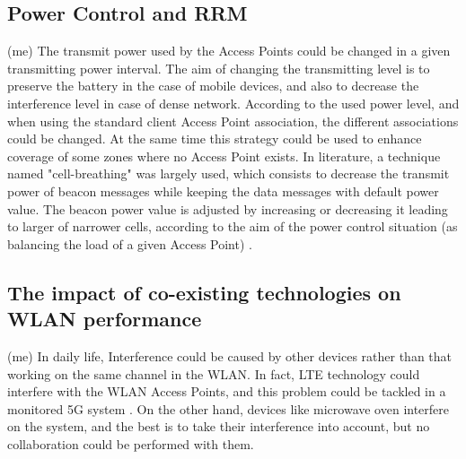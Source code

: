 \documentclass[journal,transmag]{IEEEtran}
\begin{document}
\subsection{Power Control and RRM} (me)
The transmit power used by the Access Points could be changed in a given transmitting power interval. The aim of changing the transmitting level is to preserve the battery in the case of mobile devices, and also to decrease the interference level in case of dense network. According to the used power level, and when using the standard client Access Point association, the different associations could be changed. At the same time this strategy could be used to enhance coverage of some zones where no Access Point exists. In literature, a technique named "cell-breathing" was largely used, which consists to decrease the transmit power of beacon messages while keeping the data messages with default power value. The beacon power value is adjusted by increasing or decreasing it leading to larger of narrower cells, according to the aim of the power control situation (as balancing the load of a given Access Point) \cite{11proportional_fairness_power_control}.  

\subsection{The impact of co-existing technologies on WLAN performance} (me)
In daily life, Interference could be caused by other devices rather than that working on the same channel in the WLAN. In fact, LTE technology could interfere with the WLAN Access Points, and this problem could be tackled in a monitored 5G system \cite{15coordinate_dynamic_spectrum_LTE_WIFI}. On the other hand, devices like microwave oven interfere on the system, and the best is to take their interference into account, but no collaboration could be performed with them.  
\end{document}
